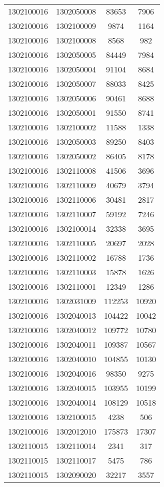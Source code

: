 \begin{longtable}{llcc}
1302100016 & 1302050008 & 83653 & 7906\\
1302100016 & 1302100009 & 9874 & 1164\\
1302100016 & 1302100008 & 8568 & 982\\
1302100016 & 1302050005 & 84449 & 7984\\
1302100016 & 1302050004 & 91104 & 8684\\
1302100016 & 1302050007 & 88033 & 8425\\
1302100016 & 1302050006 & 90461 & 8688\\
1302100016 & 1302050001 & 91550 & 8741\\
1302100016 & 1302100002 & 11588 & 1338\\
1302100016 & 1302050003 & 89250 & 8403\\
1302100016 & 1302050002 & 86405 & 8178\\
1302100016 & 1302110008 & 41506 & 3696\\
1302100016 & 1302110009 & 40679 & 3794\\
1302100016 & 1302110006 & 30481 & 2817\\
1302100016 & 1302110007 & 59192 & 7246\\
1302100016 & 1302100014 & 32338 & 3695\\
1302100016 & 1302110005 & 20697 & 2028\\
1302100016 & 1302110002 & 16788 & 1736\\
1302100016 & 1302110003 & 15878 & 1626\\
1302100016 & 1302110001 & 12349 & 1286\\
1302100016 & 1302031009 & 112253 & 10920\\
1302100016 & 1302040013 & 104422 & 10042\\
1302100016 & 1302040012 & 109772 & 10780\\
1302100016 & 1302040011 & 109387 & 10567\\
1302100016 & 1302040010 & 104855 & 10130\\
1302100016 & 1302040016 & 98350 & 9275\\
1302100016 & 1302040015 & 103955 & 10199\\
1302100016 & 1302040014 & 108129 & 10518\\
1302100016 & 1302100015 & 4238 & 506\\
1302100016 & 1302012010 & 175873 & 17307\\
1302110015 & 1302110014 & 2341 & 317\\
1302110015 & 1302110017 & 5475 & 786\\
1302110015 & 1302090020 & 32217 & 3557\\

\end{longtable}

